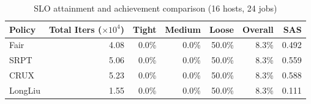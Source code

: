 \begin{table}[t]
\centering
\caption{SLO attainment and achievement comparison (16 hosts, 24 jobs)}
\label{tab:slo_16host}
\begin{tabular}{l|r|r|r|r|r|r}
\hline
Policy & Total Iters ($\times 10^4$) & Tight & Medium & Loose & Overall & SAS \\
\hline
Fair & 4.08 & 0.0\% & 0.0\% & 50.0\% & 8.3\% & 0.492 \\
SRPT & 5.06 & 0.0\% & 0.0\% & 50.0\% & 8.3\% & 0.559 \\
CRUX & 5.23 & 0.0\% & 0.0\% & 50.0\% & 8.3\% & 0.588 \\
LongLiu & 1.55 & 0.0\% & 0.0\% & 50.0\% & 8.3\% & 0.111 \\
\hline
\end{tabular}
\end{table}
